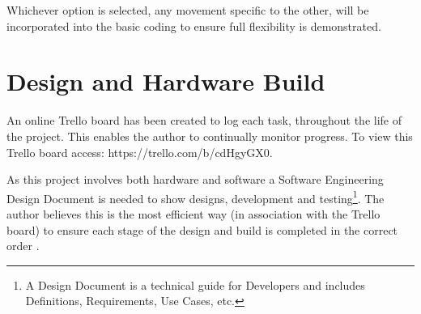 \documentclass[progress]{cmpreport}
\begin{document}
Whichever option is selected, any movement specific to the other, will be incorporated into the basic coding to ensure full flexibility is demonstrated. 


\section{Design and Hardware Build}

An online Trello board has been created to log each task, throughout the life of the project. This enables the author to continually monitor progress. To view this Trello board access: https://trello.com/b/cdHgyGX0.

As this project involves both hardware and software a Software Engineering Design Document is needed to show designs, development and testing\footnote{A Design Document is a technical guide for Developers and includes Definitions, Requirements, Use Cases, etc.}. The author believes this is the most efficient way (in association with the Trello board) to ensure each stage of the design and build is completed in the correct order \citep{mcelrath}. \newline
\end{document}
